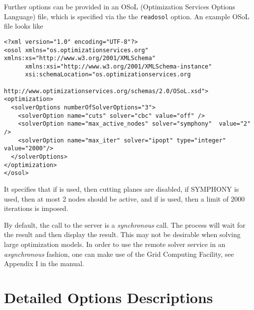 Further options can be provided in an OSoL (Optimization Services Options Language) file, which is specified via the the \texttt{readosol} option.
An example OSoL file looks like
\begin{verbatim}
<?xml version="1.0" encoding="UTF-8"?>
<osol xmlns="os.optimizationservices.org" xmlns:xs="http://www.w3.org/2001/XMLSchema"
      xmlns:xsi="http://www.w3.org/2001/XMLSchema-instance"
      xsi:schemaLocation="os.optimizationservices.org
                          http://www.optimizationservices.org/schemas/2.0/OSoL.xsd">
<optimization>
  <solverOptions numberOfSolverOptions="3">
    <solverOption name="cuts" solver="cbc" value="off" />
    <solverOption name="max_active_nodes" solver="symphony"  value="2" />
    <solverOption name="max_iter" solver="ipopt" type="integer" value="2000"/>
  </solverOptions>
</optimization>
</osol>
\end{verbatim}
It specifies that if \CBC is used, then cutting planes are disabled,
if \textsc{SYMPHONY} is used, then at most 2 nodes should be active,
and if \IPOPT is used, then a limit of 2000 iterations is imposed.

By default, the call to the server is a \emph{synchronous} call.
The \GAMS process will wait for the result and then display the result.
This may not be desirable when solving large optimization models.
In order to use the remote solver service in an \emph{asynchronous} fashion, one can make use of the \GAMS Grid Computing Facility, see Appendix I in the \GAMS manual.

\section{Detailed Options Descriptions}




%


\chapterend
